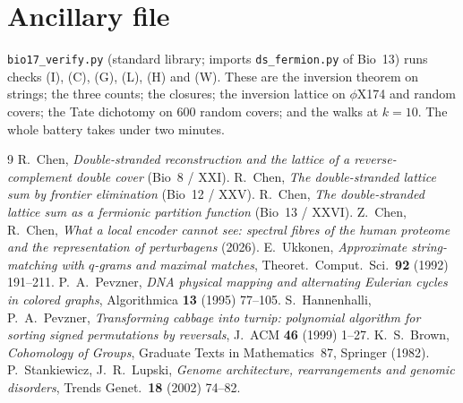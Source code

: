 \documentclass[11pt]{article}
\theoremstyle{plain}
\theoremstyle{definition}
\theoremstyle{remark}
\begin{document}
\section*{Ancillary file}
\texttt{bio17\_verify.py} (standard library; imports \texttt{ds\_fermion.py} of Bio~13) runs checks
(I), (C), (G), (L), (H) and (W). These are the inversion theorem on strings; the three counts; the
closures; the inversion lattice on $\phi$X174 and random covers; the Tate dichotomy on $600$ random
covers; and the walks at $k=10$. The whole battery takes under two minutes.

\begin{thebibliography}{9}
 R.~Chen, \emph{Double-stranded reconstruction and the lattice of a reverse-complement
double cover} (Bio~8 / XXI).
 R.~Chen, \emph{The double-stranded lattice sum by frontier elimination} (Bio~12 / XXV).
 R.~Chen, \emph{The double-stranded lattice sum as a fermionic partition function}
(Bio~13 / XXVI).
 Z.~Chen, R.~Chen, \emph{What a local encoder cannot see: spectral fibres of the human
proteome and the representation of perturbagens} (2026).
 E.~Ukkonen, \emph{Approximate string-matching with $q$-grams and maximal matches},
Theoret.\ Comput.\ Sci.\ \textbf{92} (1992) 191--211.
 P.~A.~Pevzner, \emph{DNA physical mapping and alternating Eulerian cycles in colored
graphs}, Algorithmica \textbf{13} (1995) 77--105.
 S.~Hannenhalli, P.~A.~Pevzner, \emph{Transforming cabbage into turnip: polynomial
algorithm for sorting signed permutations by reversals}, J.\ ACM \textbf{46} (1999) 1--27.
 K.~S.~Brown, \emph{Cohomology of Groups}, Graduate Texts in Mathematics~87, Springer
(1982).
 P.~Stankiewicz, J.~R.~Lupski, \emph{Genome architecture, rearrangements and genomic
disorders}, Trends Genet.\ \textbf{18} (2002) 74--82.
\end{thebibliography}
\end{document}
